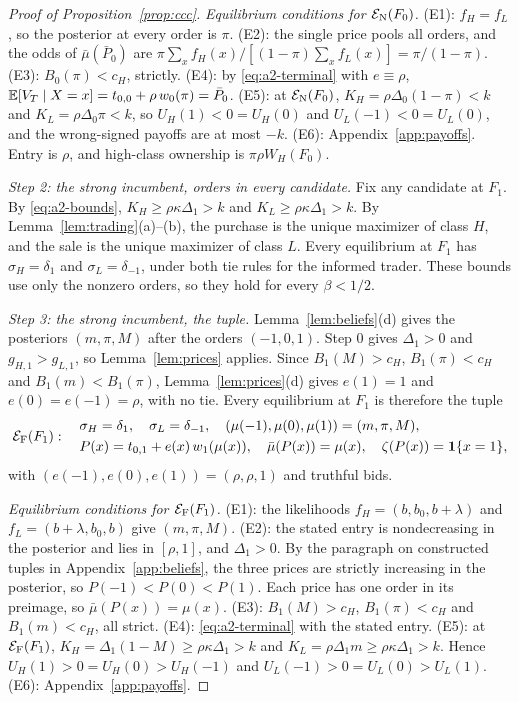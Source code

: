 \begin{proof}[Proof of Proposition~\ref{prop:ccc}]
\emph{Equilibrium conditions for \(\mathcal E_{\rm N}(F_0)\).} (E1): \(f_H=f_L\), so the posterior at every order is \(\pi\). (E2): the
single price pools all orders, and the odds of \(\bar\mu(\bar P_0)\) are
\(\pi\sum_xf_H(x)/[(1-\pi)\sum_xf_L(x)]=\pi/(1-\pi)\). (E3): \(B_0(\pi)<c_H\), strictly. (E4): by
\eqref{eq:a2-terminal} with \(e\equiv\rho\), \(\mathbb{E}[V_T\mid X=x]=t_{0,0}+\rho\,w_0(\pi)=\bar P_0\). (E5): at
\(\mathcal E_{\rm N}(F_0)\), \(K_H=\rho\Delta_0(1-\pi)<k\) and \(K_L=\rho\Delta_0\pi<k\), so \(U_H(1)<0=U_H(0)\) and
\(U_L(-1)<0=U_L(0)\), and the wrong-signed payoffs are at most \(-k\). (E6): Appendix~\ref{app:payoffs}. Entry is
\(\rho\), and high-class ownership is \(\pi\rho W_H(F_0)\).

\emph{Step 2: the strong incumbent, orders in every candidate.} Fix any candidate at \(F_1\). By
\eqref{eq:a2-bounds}, \(K_H\ge\rho\kappa\Delta_1>k\) and \(K_L\ge\rho\kappa\Delta_1>k\). By
Lemma~\ref{lem:trading}(a)--(b), the purchase is the unique maximizer of class \(H\), and the sale is the unique
maximizer of class \(L\). Every equilibrium at \(F_1\) has \(\sigma_H=\delta_1\) and \(\sigma_L=\delta_{-1}\), under
both tie rules for the informed trader. These bounds use only the nonzero orders, so they hold for every \(\beta<1/2\).

\emph{Step 3: the strong incumbent, the tuple.} Lemma~\ref{lem:beliefs}(d) gives the posteriors \((m,\pi,M)\) after
the orders \((-1,0,1)\). Step 0 gives \(\Delta_1>0\) and \(g_{H,1}>g_{L,1}\), so Lemma~\ref{lem:prices} applies.
Since \(B_1(M)>c_H\), \(B_1(\pi)<c_H\) and \(B_1(m)<B_1(\pi)\), Lemma~\ref{lem:prices}(d) gives \(e(1)=1\) and
\(e(0)=e(-1)=\rho\), with no tie. Every equilibrium at \(F_1\) is therefore the tuple
\[
\mathcal E_{\rm F}(F_1):\quad
\begin{aligned}
&\sigma_H=\delta_1,\quad \sigma_L=\delta_{-1},\quad (\mu(-1),\mu(0),\mu(1))=(m,\pi,M),\\
&P(x)=t_{0,1}+e(x)\,w_1(\mu(x)),\quad \bar\mu(P(x))=\mu(x),\quad \zeta(P(x))=\mathbf{1}\{x=1\},
\end{aligned}
\]
with \((e(-1),e(0),e(1))=(\rho,\rho,1)\) and truthful bids.

\emph{Equilibrium conditions for \(\mathcal E_{\rm F}(F_1)\).} (E1): the likelihoods \(f_H=(b,b_0,b+\lambda)\) and
\(f_L=(b+\lambda,b_0,b)\) give \((m,\pi,M)\). (E2): the stated entry is nondecreasing in the posterior and lies in
\([\rho,1]\), and \(\Delta_1>0\). By the paragraph on constructed tuples in Appendix~\ref{app:beliefs}, the three
prices are strictly increasing in the posterior, so \(P(-1)<P(0)<P(1)\). Each price has one order in its
preimage, so \(\bar\mu(P(x))=\mu(x)\). (E3): \(B_1(M)>c_H\), \(B_1(\pi)<c_H\) and \(B_1(m)<c_H\), all strict.
(E4): \eqref{eq:a2-terminal} with the stated entry. (E5): at \(\mathcal E_{\rm F}(F_1)\), \(K_H=\Delta_1(1-M)\ge\rho\kappa\Delta_1>k\)
and \(K_L=\rho\Delta_1m\ge\rho\kappa\Delta_1>k\). Hence \(U_H(1)>0=U_H(0)>U_H(-1)\) and
\(U_L(-1)>0=U_L(0)>U_L(1)\). (E6): Appendix~\ref{app:payoffs}.


\end{proof}

